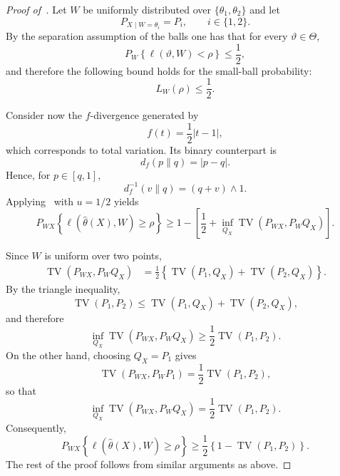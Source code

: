 \documentclass[11pt]{article}
\theoremstyle{definition}
\theoremstyle{remark}
\newcommand{\1}{\boldsymbol{1}}
\begin{document}
\begin{proof}[Proof of~]
Let $W$ be uniformly distributed over $\{\theta_1,\theta_2\}$ and let
\[
    P_{X\mid W=\theta_i}=P_i,
    \qquad i\in\{1,2\}.
\]
By the separation assumption of the balls one has that for every $\vartheta\in\Theta$,
\begin{equation}
    P_W\left\{
    \ell(\vartheta,W)<\rho
    \right\}
    \leq\frac12,
\end{equation}
and therefore the following bound holds for the small-ball probability:
\begin{equation}
    L_W(\rho)\leq\frac12.
\end{equation}

Consider now the $f$-divergence generated by
\[
    f(t)=\frac12|t-1|,
\]
which corresponds to total variation. Its binary counterpart is
\begin{equation}
    d_f(p\|q)=|p-q|.
\end{equation}
Hence, for $p\in[q,1]$,
\begin{equation}
    d_f^{-1}(v\|q)
    =
    (q+v)\wedge1.
\end{equation}
Applying~ with $u=1/2$ yields
\begin{equation}
    P_{WX}
    \left\{
    \ell(\widehat\theta(X),W)\geq\rho
    \right\}
    \geq
    1-
    \left[
    \frac12+
    \inf_{Q_X}
    \operatorname{TV}(P_{WX},P_WQ_X)
    \right].
\end{equation}

Since $W$ is uniform over two points,
\begin{align}
    \operatorname{TV}(P_{WX},P_WQ_X)
    &=
    \frac12
    \left\{
    \operatorname{TV}(P_1,Q_X)
    +
    \operatorname{TV}(P_2,Q_X)
    \right\}.
\end{align}
By the triangle inequality,
\begin{equation}
    \operatorname{TV}(P_1,P_2)
    \leq
    \operatorname{TV}(P_1,Q_X)
    +
    \operatorname{TV}(P_2,Q_X),
\end{equation}
and therefore
\begin{equation}
    \inf_{Q_X}
    \operatorname{TV}(P_{WX},P_WQ_X)
    \geq
    \frac12\operatorname{TV}(P_1,P_2).
\end{equation}
On the other hand, choosing $Q_X=P_1$ gives
\begin{equation}
    \operatorname{TV}(P_{WX},P_WP_1)
    =
    \frac12\operatorname{TV}(P_1,P_2),
\end{equation}
so that
\begin{equation}
    \inf_{Q_X}
    \operatorname{TV}(P_{WX},P_WQ_X)
    =
    \frac12\operatorname{TV}(P_1,P_2).
\end{equation}
Consequently,
\begin{equation}
    P_{WX}
    \left\{
    \ell(\widehat\theta(X),W)\geq\rho
    \right\}
    \geq
    \frac12
    \left\{
    1-\operatorname{TV}(P_1,P_2)
    \right\}.
\end{equation}
The rest of the proof follows from similar arguments as above.
\end{proof}
\end{document}
